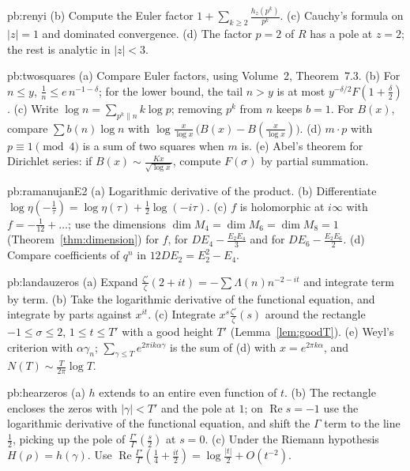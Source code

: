 \begin{hint}{pb:renyi}
(b) Compute the Euler factor $1+\sum_{k\ge2}\frac{h_z(p^k)}{p^k}$. (c) Cauchy's formula on $|z|=1$ and dominated convergence. (d) The factor $p=2$ of $R$ has a pole at $z=2$; the rest
is analytic in $|z|<3$.
\end{hint}

\begin{hint}{pb:twosquares}
(a) Compare Euler factors, using Volume~2, Theorem~7.3. (b) For $n\le y$, $\frac1n\le e\,n^{-1-\delta}$; for the lower bound, the tail $n>y$ is at most
$y^{-\delta/2}F(1+\frac\delta2)$. (c) Write $\log n=\sum_{p^k\parallel n}k\log p$; removing $p^k$ from $n$ keeps $b=1$. For $B(x)$, compare $\sum b(n)\log n$ with
$\log\frac x{\log x}\,\bigl(B(x)-B(\frac x{\log x})\bigr)$. (d) $m\cdot p$ with $p\equiv1\pmod4$ is a sum of two squares when $m$ is. (e) Abel's theorem for Dirichlet series: if $B(x)\sim\frac{Kx}{\sqrt{\log x}}$,
compute $F(\sigma)$ by partial summation.
\end{hint}

\begin{hint}{pb:ramanujanE2}
(a) Logarithmic derivative of the product. (b) Differentiate $\log\eta(-\frac1\tau)=\log\eta(\tau)+\frac12\log(-i\tau)$. (c) $f$ is holomorphic at $i\infty$ with $f=-\frac1{12}+\dots$;
use the dimensions $\dim M_4=\dim M_6=\dim M_8=1$ (Theorem~\ref{thm:dimension}) for $f$, for $DE_4-\frac{E_2E_4}3$ and for $DE_6-\frac{E_2E_6}2$. (d) Compare coefficients of $q^n$ in
$12DE_2=E_2^2-E_4$.
\end{hint}

\begin{hint}{pb:landauzeros}
(a) Expand $\frac{\zeta'}\zeta(2+it)=-\sum\Lambda(n)n^{-2-it}$ and integrate term by term. (b) Take the logarithmic derivative of the functional equation, and integrate by
parts against $x^{it}$. (c) Integrate $x^s\frac{\zeta'}\zeta(s)$ around the rectangle $-1\le\sigma\le2$, $1\le t\le T'$ with a good height $T'$ (Lemma~\ref{lem:goodT}). (e) Weyl's criterion
with $\alpha\gamma_n$; $\sum_{\gamma\le T}e^{2\pi ik\alpha\gamma}$ is the sum of (d) with $x=e^{2\pi k\alpha}$, and $N(T)\sim\frac T{2\pi}\log T$.
\end{hint}

\begin{hint}{pb:hearzeros}
(a) $h$ extends to an entire even function of $t$. (b) The rectangle encloses the zeros with $|\gamma|<T'$ and the pole at $1$; on $\operatorname{Re}s=-1$ use the
logarithmic derivative of the functional equation, and shift the $\Gamma$ term to the line $\frac12$, picking up the pole of $\frac{\Gamma'}\Gamma(\frac s2)$ at $s=0$. (c) Under the
Riemann hypothesis $H(\rho)=h(\gamma)$. Use $\operatorname{Re}\frac{\Gamma'}\Gamma(\frac14+\frac{it}2)=\log\frac{|t|}2+O(t^{-2})$.
\end{hint}


